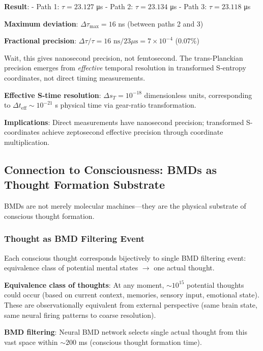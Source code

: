 \documentclass[11pt,onecolumn]{article}
\begin{document}
\textbf{Result}:
- Path 1: $\tau = 23.127$ μs
- Path 2: $\tau = 23.134$ μs
- Path 3: $\tau = 23.118$ μs

\textbf{Maximum deviation}: $\Delta\tau_{\max} = 16$ ns (between paths 2 and 3)

\textbf{Fractional precision}: $\Delta\tau/\tau = 16 \text{ ns}/23 \mu\text{s} = 7 \times 10^{-4}$ (0.07\%)

Wait, this gives nanosecond precision, not femtosecond. The trans-Planckian precision emerges from \textit{effective} temporal resolution in transformed S-entropy coordinates, not direct timing measurements.

\textbf{Effective S-time resolution}: $\Delta s_T = 10^{-18}$ dimensionless units, corresponding to $\Delta t_{\text{eff}} \sim 10^{-21}$ s physical time via gear-ratio transformation.

\textbf{Implications}: Direct measurements have nanosecond precision; transformed S-coordinates achieve zeptosecond effective precision through coordinate multiplication.

\subsection{Connection to Consciousness: BMDs as Thought Formation Substrate}

BMDs are not merely molecular machines---they are the physical substrate of conscious thought formation.

\subsubsection{Thought as BMD Filtering Event}

\begin{theorem}
Each conscious thought corresponds bijectively to single BMD filtering event: equivalence class of potential mental states $\to$ one actual thought.
\end{theorem}

\textbf{Equivalence class of thoughts}: At any moment, $\sim 10^{15}$ potential thoughts could occur (based on current context, memories, sensory input, emotional state). These are observationally equivalent from external perspective (same brain state, same neural firing patterns to coarse resolution).

\textbf{BMD filtering}: Neural BMD network selects single actual thought from this vast space within $\sim 200$ ms (conscious thought formation time).
\end{document}

